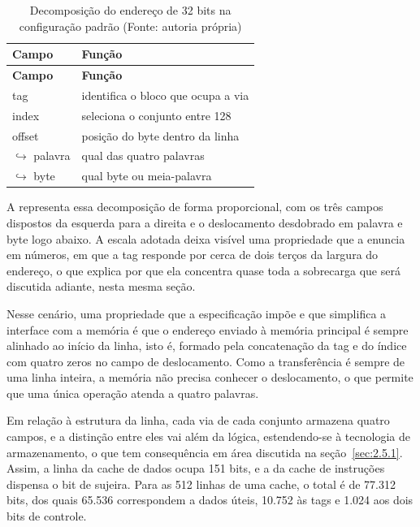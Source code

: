 {\small
\begin{longtable}{@{}>{\raggedright\arraybackslash}p{}>{\raggedright\arraybackslash}p{}@{}}
\caption[Decomposição do endereço de 32 bits na configuração padrão]{Decomposição do endereço de 32 bits na configuração padrão (Fonte: autoria própria)}\label{tab:3.4}\\
\hline
\textbf{Campo} & \textbf{Função} \\
\hline
\endfirsthead
\hline
\textbf{Campo} & \textbf{Função} \\
\hline
\endhead
\hline
\endlastfoot
tag & identifica o bloco que ocupa a via \\
index & seleciona o conjunto entre 128 \\
offset & posição do byte dentro da linha \\
$\hookrightarrow$ palavra & qual das quatro palavras \\
$\hookrightarrow$ byte & qual byte ou meia-palavra \\
\end{longtable}
}

A  representa essa decomposição de forma proporcional, com os três campos dispostos da esquerda para a direita e o deslocamento desdobrado em palavra e byte logo abaixo. A escala adotada deixa visível uma propriedade que a  enuncia em números, em que a tag responde por cerca de dois terços da largura do endereço, o que explica por que ela concentra quase toda a sobrecarga que será discutida adiante, nesta mesma seção.


Nesse cenário, uma propriedade que a especificação impõe e que simplifica a interface com a memória é que o endereço enviado à memória principal é sempre alinhado ao início da linha, isto é, formado pela concatenação da tag e do índice com quatro zeros no campo de deslocamento. Como a transferência é sempre de uma linha inteira, a memória não precisa conhecer o deslocamento, o que permite que uma única operação atenda a quatro palavras.

Em relação à estrutura da linha, cada via de cada conjunto armazena quatro campos, e a distinção entre eles vai além da lógica, estendendo-se à tecnologia de armazenamento, o que tem consequência em área discutida na seção~\ref{sec:2.5.1}. Assim, a linha da cache de dados ocupa 151 bits, e a da cache de instruções dispensa o bit de sujeira. Para as 512 linhas de uma cache, o total é de 77.312 bits, dos quais 65.536 correspondem a dados úteis, 10.752 às tags e 1.024 aos dois bits de controle.

